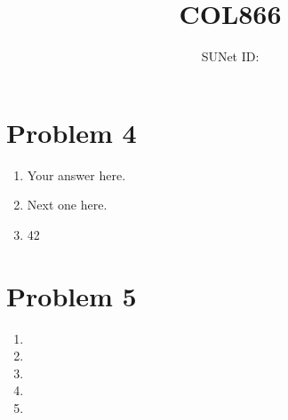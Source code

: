 \documentclass{article}
\title{COL866 \exerciseset}
\author{\studentname \qquad SUNet ID: \suid}
\begin{document}
\maketitle

\section*{Problem 4}
\begin{enumerate}
\item %
Your answer here.

\item %
Next one here.

\item %
42

\end{enumerate}

\section*{Problem 5}
\begin{enumerate}
\item %

\item %

\item %

\item %

\item %

\end{enumerate}
\end{document}
